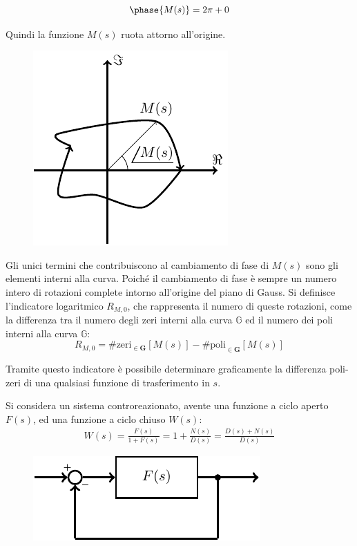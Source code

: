 \documentclass{article}
\numberwithin{equation}{subsection}
\begin{document}
\begin{equation*}
    \phase{M(s)}=2\pi+0
\end{equation*}

Quindi la funzione $M(s)$ ruota attorno all'origine. 

\begin{figure}[H]%
    \centering
    \includegraphics{nyquist-2.pdf}%
\end{figure}

Gli unici termini che contribuiscono al cambiamento di fase di $M(s)$ sono gli elementi interni alla curva. Poiché il cambiamento di fase è sempre un numero intero di 
rotazioni complete intorno all'origine del piano di Gauss. Si definisce l'indicatore logaritmico $R_{M,0}$, che rappresenta il numero di queste rotazioni, come la differenza 
tra il numero degli zeri interni alla curva $\mathbb{G}$ ed il numero dei poli interni alla curva $\mathbb{G}$: 
\begin{equation*}
    R_{M,0}=\#\mathrm{zeri}_{\in \mathbf{G}}[M(s)]-\#\mathrm{poli}_{\in \mathbf{G}}[M(s)]
\end{equation*}

Tramite questo indicatore è possibile determinare graficamente la differenza poli-zeri di una qualsiasi funzione di trasferimento in $s$. 

Si considera un sistema controreazionato, avente una funzione a ciclo aperto $F(s)$, ed una funzione a ciclo chiuso  $W(s)$:
\begin{gather*}
    W(s)=\displaystyle\frac{F(s)}{1+F(s)}=1+\frac{N(s)}{D(s)}=\frac{D(s)+N(s)}{D(s)}
\end{gather*}

\begin{figure}[H]%
    \centering
    \includegraphics{controreazione-4.pdf}%
\end{figure}
\end{document}
